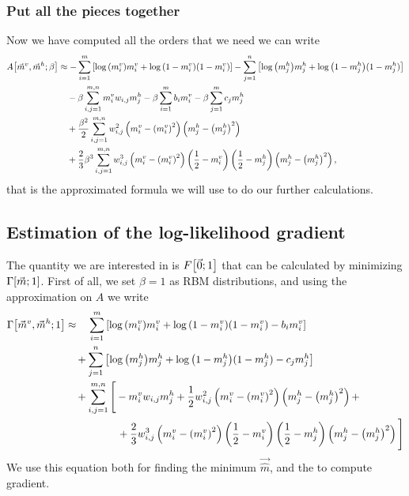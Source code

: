 \subsubsection{Put all the pieces together}
Now we have computed all the orders that we need we can write
\begin{align*}
A{\left[\vec{m}^v, \vec{m}^h;\beta\right]} &\approx
  -\sum_{i=1}^{m}\left[\log{\left(m_i^v\right)}m_i^v + \log{\left(1-m_i^v\right)}(1-m_i^v)\right]
  -\sum_{j=1}^{n}\left[\log{\left(m_j^h\right)}m_j^h + \log{\left(1-m_j^h\right)}(1-m_j^h)\right]\\
  &\quad-\beta \sum_{i,j=1}^{m,n}m_i^v w_{i,j} m_j^h -\beta\sum_{i=1}^{m} b_im_i^v -\beta\sum_{j=1}^{m} c_jm_j^h\\
  &\quad+\frac{\beta^2}{2}
  \sum_{i,j=1}^{m,n} w_{i,j}^2\left(m_i^v-{\left(m_i^v\right)}^2\right)\left(m_j^h-{\left(m_j^h\right)}^2\right)\\
  &\quad+\frac{2}{3}\beta^3 
    \sum_{i,j=1}^{m,n} w_{i,j}^3\left(m_i^v-{\left(m_i^v\right)}^2\right) \left(\frac{1}{2}-m_i^v\right)
    \left(\frac{1}{2}-m_j^h\right) \left(m_j^h-{\left(m_j^h\right)}^2\right),
\end{align*}
that is the approximated formula we will use to do our further calculations.

\subsection{Estimation of the log-likelihood gradient}
The quantity we are interested in is \(F{\left[\vec{0};1\right]}\) that can be calculated by minimizing \(\Gamma{\left[\vec{m};1\right]}\).
First of all, we set \(\beta=1\) as RBM distributions, and using the approximation
on \(A\) we write
\begin{align*}
  \Gamma{\left[\vec{m}^v, \vec{m}^h;1\right]} &\approx
    \quad\sum_{i=1}^{m}\left[\log{\left(m_i^v\right)}m_i^v + \log{\left(1-m_i^v\right)}(1-m_i^v)-b_im_i^v\right]\\
    &\quad+\sum_{j=1}^{n}\left[\log{\left(m_j^h\right)}m_j^h+\log{\left(1-m_j^h\right)}(1-m_j^h)-c_jm_j^h\right]\\
    &\quad+\sum_{i,j=1}^{m,n}\Bigg[
      -m_i^v w_{i,j}m_j^h
      +\frac{1}{2}w_{i,j}^2\left(m_i^v-{\left(m_i^v\right)}^2\right)\left(m_j^h-{\left(m_j^h\right)}^2\right)+\\
      &\qquad\qquad\quad+\frac{2}{3}w_{i,j}^3\left(m_i^v-{\left(m_i^v\right)}^2\right)\left(\frac{1}{2}-m_i^v\right)\left(\frac{1}{2}-m_j^h\right)
        \left(m_j^h-{\left(m_j^h\right)}^2\right)
    \Bigg]
\end{align*}
We use this equation both for finding the minimum \(\vec{\hat{m}}\), and the to compute gradient.

